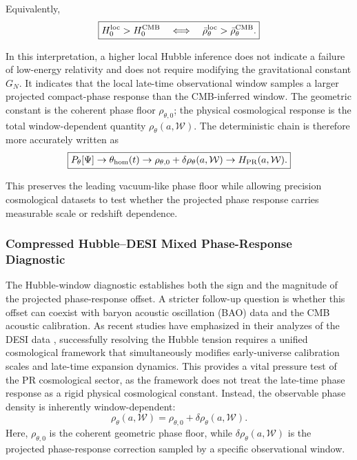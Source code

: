 \documentclass[11pt]{article}
\begin{document}
Equivalently,
\begin{equation}
\boxed{
H_0^{\rm loc} > H_0^{\rm CMB}
\quad
\Longleftrightarrow
\quad
\bar\rho_{\theta}^{\rm loc}
>
\bar\rho_{\theta}^{\rm CMB}.
}
\end{equation}

In this interpretation, a higher local Hubble inference does not indicate a failure of low-energy relativity and does not require modifying the gravitational constant \(G_N\). It indicates that the local late-time observational window samples a larger projected compact-phase response than the CMB-inferred window. The geometric constant is the coherent phase floor \(\rho_{\theta,0}\); the physical cosmological response is the total window-dependent quantity \(\rho_\theta(a,\mathcal W)\). The deterministic chain is therefore more accurately written as
\begin{equation}
\boxed{
P_\theta[\Psi]
\rightarrow
\theta_{\rm hom}(t)
\rightarrow
\rho_{\theta,0}
+
\delta\rho_\theta(a,\mathcal W)
\rightarrow
H_{\rm PR}(a,\mathcal W).
}
\end{equation}

This preserves the leading vacuum-like phase floor while allowing precision cosmological datasets to test whether the projected phase response carries measurable scale or redshift dependence.

\subsubsection{Compressed Hubble--DESI Mixed Phase-Response Diagnostic}
\label{sec:hubble_desi_mixed_response}

The Hubble-window diagnostic establishes both the sign and the magnitude of the projected phase-response offset. A stricter follow-up question is whether this offset can coexist with baryon acoustic oscillation (BAO) data and the CMB acoustic calibration. As recent studies have emphasized in their analyzes of the DESI data \cite{Adame2024DESI, Giare2024_Dynamical, Li2026_DarkSector}, successfully resolving the Hubble tension requires a unified cosmological framework that simultaneously modifies early-universe calibration scales and late-time expansion dynamics. This provides a vital pressure test of the PR cosmological sector, as the framework does not treat the late-time phase response as a rigid physical cosmological constant. Instead, the observable phase density is inherently window-dependent:
\begin{equation}
\boxed{
\rho_\theta(a,\mathcal W)
=
\rho_{\theta,0}
+
\delta\rho_\theta(a,\mathcal W).
}
\end{equation}
Here, \(\rho_{\theta,0}\) is the coherent geometric phase floor, while \(\delta\rho_\theta(a,\mathcal W)\) is the projected phase-response correction sampled by a specific observational window.
\end{document}
